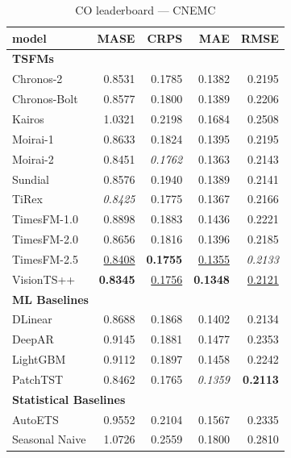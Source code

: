 \begin{table}[H]
\caption{CO leaderboard --- CNEMC}
\centering
\begin{small}
\begin{tabular}{lrrrr}
\toprule
model & MASE & CRPS & MAE & RMSE \\
\midrule
\multicolumn{5}{l}{\textbf{TSFMs}} \\
Chronos-2 & 0.8531 & 0.1785 & 0.1382 & 0.2195 \\
Chronos-Bolt & 0.8577 & 0.1800 & 0.1389 & 0.2206 \\
Kairos & 1.0321 & 0.2198 & 0.1684 & 0.2508 \\
Moirai-1 & 0.8633 & 0.1824 & 0.1395 & 0.2195 \\
Moirai-2 & 0.8451 & \textit{0.1762} & 0.1363 & 0.2143 \\
Sundial & 0.8576 & 0.1940 & 0.1389 & 0.2141 \\
TiRex & \textit{0.8425} & 0.1775 & 0.1367 & 0.2166 \\
TimesFM-1.0 & 0.8898 & 0.1883 & 0.1436 & 0.2221 \\
TimesFM-2.0 & 0.8656 & 0.1816 & 0.1396 & 0.2185 \\
TimesFM-2.5 & \underline{0.8408} & \textbf{0.1755} & \underline{0.1355} & \textit{0.2133} \\
VisionTS++ & \textbf{0.8345} & \underline{0.1756} & \textbf{0.1348} & \underline{0.2121} \\
\midrule
\multicolumn{5}{l}{\textbf{ML Baselines}} \\
DLinear & 0.8688 & 0.1868 & 0.1402 & 0.2134 \\
DeepAR & 0.9145 & 0.1881 & 0.1477 & 0.2353 \\
LightGBM & 0.9112 & 0.1897 & 0.1458 & 0.2242 \\
PatchTST & 0.8462 & 0.1765 & \textit{0.1359} & \textbf{0.2113} \\
\midrule
\multicolumn{5}{l}{\textbf{Statistical Baselines}} \\
AutoETS & 0.9552 & 0.2104 & 0.1567 & 0.2335 \\
Seasonal Naive & 1.0726 & 0.2559 & 0.1800 & 0.2810 \\
\bottomrule
\end{tabular}
\end{small}
\end{table}